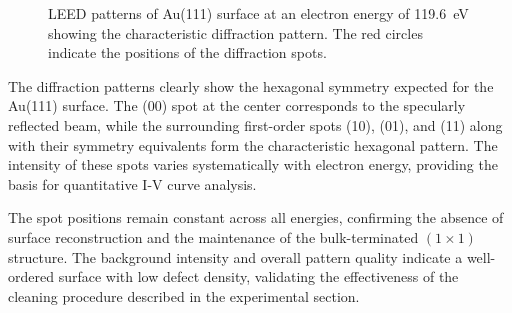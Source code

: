 \documentclass[fontsize=11pt,reqno,a4paper,oneside]{scrartcl}
\begin{document}
\begin{figure}[H]
    \hfill
    
    \caption{LEED patterns of Au(111) surface at an electron energy of 119.6~\si{eV} showing the characteristic diffraction pattern. The red circles indicate the positions of the diffraction spots.}
    \label{fig:leed_patterns}
\end{figure}

The diffraction patterns clearly show the hexagonal symmetry expected for the Au(111) surface. The (00) spot at the center corresponds to the specularly reflected beam, while the surrounding first-order spots (10), (01), and (11) along with their symmetry equivalents form the characteristic hexagonal pattern. The intensity of these spots varies systematically with electron energy, providing the basis for quantitative I-V curve analysis.

The spot positions remain constant across all energies, confirming the absence of surface reconstruction and the maintenance of the bulk-terminated $(1 \times 1)$ structure. The background intensity and overall pattern quality indicate a well-ordered surface with low defect density, validating the effectiveness of the cleaning procedure described in the experimental section.
\end{document}
